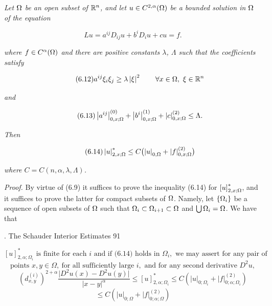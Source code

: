\begin{theorem}
\label{gt-ch06-thm-6-2}
\textit{Let $\Omega$ be an open subset of $\mathbb{R}^n$, and let $u\in C^{2,\alpha}(\Omega)$ be a bounded solution in $\Omega$ of the equation}

\[
Lu=a^{ij}D_{ij}u+b^iD_i u+cu=f.
\]

\textit{where $f\in C^\alpha(\Omega)$ and there are positive constants $\lambda$, $\Lambda$ such that the coefficients satisfy}

\begin{equation}
\tag{6.12}
a^{ij}\xi_i\xi_j\ge \lambda\left|\xi\right|^2 \qquad \forall x\in \Omega,\ \xi\in \mathbb{R}^n
\end{equation}

\textit{and}

\begin{equation}
\tag{6.13}
\left|a^{ij}\right|_{0,x;\Omega}^{(0)}+\left|b^i\right|_{0,x;\Omega}^{(1)}+\left|c\right|_{0,x;\Omega}^{(2)}\le \Lambda.
\end{equation}

\textit{Then}

\begin{equation}
\tag{6.14}
\left|u\right|_{2,x;\Omega}^*\le C\bigl(\left|u\right|_{0,\Omega}+\left|f\right|_{0,x;\Omega}^{(2)}\bigr)
\end{equation}

\textit{where $C=C(n,\alpha,\lambda,\Lambda)$.}

\textit{Proof.} By virtue of (6.9) it suffices to prove the inequality (6.14) for $\left[u\right]^*_{2,x;\Omega}$, and it suffices to prove the latter for compact subsets of $\Omega$. Namely, let $\{\Omega_i\}$ be a sequence of open subsets of $\Omega$ such that $\Omega_i\subset \Omega_{i+1}\subset \Omega$ and $\bigcup \Omega_i=\Omega$. We have that





. The Schauder Interior Estimates \hfill 91

\[
[u]^{*}_{2,\alpha;\Omega_i} \text{ is finite for each } i \text{ and if (6.14) holds in } \Omega_i, \text{ we may assert for any pair of}
\]
\[
\text{points } x,y \in \Omega,\ \text{for all sufficiently large } i,\text{ and for any second derivative } D^2u,
\]
\[
\left(d^{(i)}_{x,y}\right)^{2+\alpha}\frac{\lvert D^2u(x)-D^2u(y)\rvert}{\lvert x-y\rvert^\alpha}
\le [u]^{*}_{2,\alpha;\Omega_i}
\le C\!\left(\lvert u\rvert_{0;\Omega_i}+\lvert f\rvert^{(2)}_{0;\alpha;\Omega_i}\right)
\]
\[
\le C\!\left(\lvert u\rvert_{0;\Omega}+\lvert f\rvert^{(2)}_{0;\alpha;\Omega}\right)
\]


\end{theorem}
